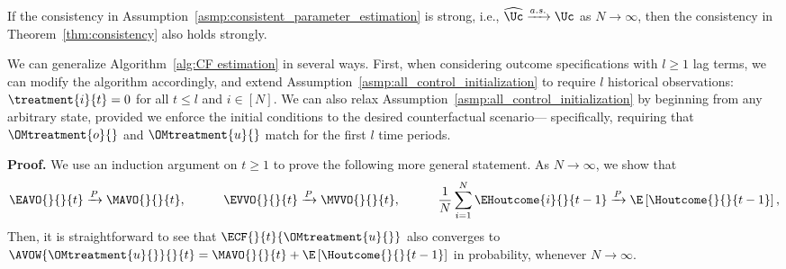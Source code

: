 \begin{remark}
    If the consistency in Assumption~\ref{asmp:consistent_parameter_estimation} is strong, i.e., $\widehat{\Uc} \xrightarrow{a.s.} \Uc$ as $N \rightarrow \infty$, then the consistency in Theorem~\ref{thm:consistency} also holds strongly.
\end{remark}
% 
\begin{remark}
    We can generalize Algorithm~\ref{alg:CF estimation} in several ways. First, when considering outcome specifications with $l \geq 1$ lag terms, we can modify the algorithm accordingly, and extend Assumption~\ref{asmp:all_control_initialization} to require $l$ historical observations: $\treatment{i}{t}=0$ for all $t \leq l$ and $i\in[N]$. We can also relax Assumption~\ref{asmp:all_control_initialization} by beginning from any arbitrary state, provided we enforce the initial conditions to the desired counterfactual scenario--- specifically, requiring that $\OMtreatment{o}{}$ and $\OMtreatment{u}{}$ match for the first $l$ time periods.
\end{remark}
\noindent
\textbf{Proof.}
% 
We use an induction argument on $t \geq 1$ to prove the following more general statement. As $N \rightarrow \infty$, we show that
% 
\begin{equation}
    \label{eq:detailed_consistency}
    \begin{aligned}
        \EAVO{}{}{t} \xrightarrow{P} \MAVO{}{}{t},
        \quad\quad\quad
        \EVVO{}{}{t} \xrightarrow{P} \MVVO{}{}{t},
        \quad\quad\quad
        \frac{1}{N} \sum_{i=1}^N \EHoutcome{i}{}{t-1}\xrightarrow{P} \E\left[ \Houtcome{}{}{t-1} \right],
    \end{aligned}
\end{equation}
% 
Then, it is straightforward to see that $\ECF{}{t}{\OMtreatment{u}{}}$ also converges to $\AVOW{\OMtreatment{u}{}}{}{t} = \MAVO{}{}{t} + \E\left[\Houtcome{}{}{t-1}\right]$ in probability, whenever $N \rightarrow \infty$.

